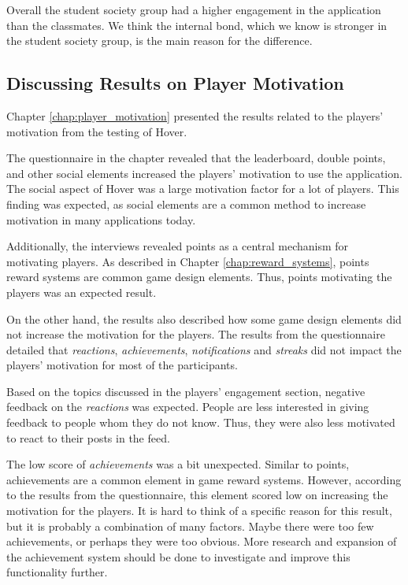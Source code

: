 Overall the student society group had a higher engagement in the application than the classmates. We think the internal bond, which we know is stronger in the student society group, is the main reason for the difference.

\subsection{Discussing Results on Player Motivation}
Chapter \ref{chap:player_motivation} presented the results related to the players’ motivation from the testing of Hover.

The questionnaire in the chapter revealed that the leaderboard, double points, and other social elements increased the players’ motivation to use the application. The social aspect of Hover was a large motivation factor for a lot of players. This finding was expected, as social elements are a common method to increase motivation in many applications today. 

Additionally, the interviews revealed points as a central mechanism for motivating players. As described in Chapter \ref{chap:reward_systems}, points reward systems are common game design elements. Thus, points motivating the players was an expected result.

On the other hand, the results also described how some game design elements did not increase the motivation for the players. The results from the questionnaire detailed that  \textit{reactions}, \textit{achievements}, \textit{notifications} and \textit{streaks} did not impact the players’ motivation for most of the participants.

Based on the topics discussed in the players’ engagement section, negative feedback on the \textit{reactions} was expected. People are less interested in giving feedback to people whom they do not know. Thus, they were also less motivated to react to their posts in the feed.

The low score of \textit{achievements} was a bit unexpected. Similar to points, achievements are a common element in game reward systems. However, according to the results from the questionnaire, this element scored low on increasing the motivation for the players. It is hard to think of a specific reason for this result, but it is probably a combination of many factors. Maybe there were too few achievements, or perhaps they were too obvious. More research and expansion of the achievement system should be done to investigate and improve this functionality further.

